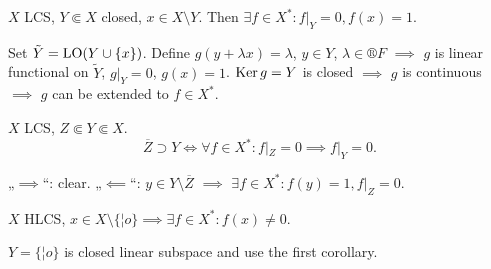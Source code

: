 \documentclass[12pt]{article}					%
\begin{document}
\begin{dusledek}
	$X$ LCS, $Y \Subset X$ closed, $x \in X \setminus Y$. Then $\exists f \in X^*: f|_Y = 0, f(x) = 1$.

	\begin{dukazin}
		Set $\tilde Y = \operatorname{LO}(Y \cup \{x\})$. Define $g(y  + λx) = λ$, $y \in Y$, $λ \in ®F$ $\implies$ $g$ is linear functional on $\tilde Y$, $g|_Y = 0$, $g(x) = 1$. $\operatorname{Ker} g = Y$ is closed $\implies$ $g$ is continuous $\implies$ $g$ can be extended to $f \in X^*$.
	\end{dukazin}
\end{dusledek}

\begin{dusledek}
	$X$ LCS, $Z \Subset Y \Subset X$.
	$$ \overline{Z} \supset Y \Leftrightarrow \forall f \in X^*: f|_Z = 0 \implies f|_Y = 0. $$

	\begin{dukazin}
		„$\implies$“: clear. „$\impliedby$“: $y \in Y \setminus \overline{Z}$ $\implies$ $\exists f \in X^*: f(y) = 1, f|_Z = 0$.
	\end{dukazin}
\end{dusledek}

\begin{dusledek}
	$X$ HLCS, $x \in X \setminus \{¦o\} \implies \exists f \in X^*: f(x) ≠ 0$.

	\begin{dukazin}
		$Y = \{¦o\}$ is closed linear subspace and use the first corollary.
	\end{dukazin}
\end{dusledek}
\end{document}
